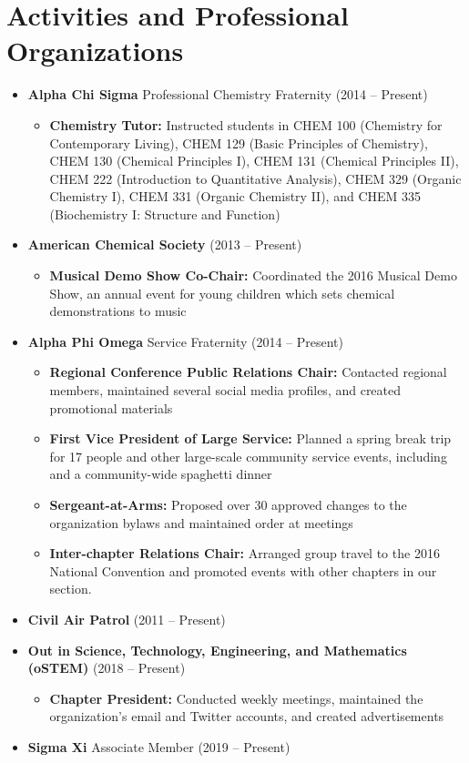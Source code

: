 \documentclass[letterpaper,11pt]{article}
\newcommand{\resumeItem}[2]{
  \item\small{
    \textbf{#1}{ #2 \vspace{-2pt}}
  }
}
\newcommand{\resumeSubItem}[2]{\resumeItem{#1}{#2}\vspace{-4pt}}
\newcommand{\resumeSubHeadingListStart}{\begin{itemize}[leftmargin=*]}
\newcommand{\resumeSubHeadingListEnd}{\end{itemize}}
\newcommand{\resumeItemListStart}{\begin{itemize}}
\newcommand{\resumeItemListEnd}{\end{itemize}\vspace{-5pt}}
\begin{document}
\section{Activities and Professional Organizations}
  \resumeSubHeadingListStart
    \resumeSubItem{Alpha Chi Sigma}
      {Professional Chemistry Fraternity (2014 -- Present)}
            \resumeItemListStart
        \resumeItem{Chemistry Tutor\textnormal{:}}
          {Instructed students in CHEM 100 (Chemistry for Contemporary Living), CHEM 129 (Basic Principles of Chemistry), CHEM 130 (Chemical Principles I), CHEM 131 (Chemical Principles II), CHEM 222 (Introduction to Quantitative Analysis), CHEM 329 (Organic Chemistry I), CHEM 331 (Organic Chemistry II), and CHEM 335 (Biochemistry I: Structure and Function)}
      \resumeItemListEnd
    \resumeSubItem{American Chemical Society}
      {(2013 -- Present)}
            \resumeItemListStart
        \resumeItem{Musical Demo Show Co-Chair\textnormal{:}}
          {Coordinated the 2016 Musical Demo Show, an annual event for young children which sets chemical demonstrations to music}
      \resumeItemListEnd
    \resumeSubItem{Alpha Phi Omega}
      {Service Fraternity (2014 -- Present)}
            \resumeItemListStart
        \resumeItem{Regional Conference Public Relations Chair\textnormal{:}}
          {Contacted regional members, maintained several social media profiles, and created promotional materials}
        \resumeItem{First Vice President of Large Service\textnormal{:}}
          {Planned a spring break trip for 17 people and other large-scale community service events, including and a community-wide spaghetti dinner}
        \resumeItem{Sergeant-at-Arms\textnormal{:}}
          {Proposed over 30 approved changes to the organization bylaws and maintained order at meetings}
        \resumeItem{Inter-chapter Relations Chair\textnormal{:}}
          {Arranged group travel to the 2016 National Convention and promoted events with other chapters in our section.}
      \resumeItemListEnd
    \resumeSubItem{Civil Air Patrol}
      {(2011 -- Present)}
   \resumeSubItem{Out in Science, Technology, Engineering, and Mathematics (oSTEM)}
      {(2018 -- Present)}
            \resumeItemListStart
        \resumeItem{Chapter President\textnormal{:}}
          {Conducted weekly meetings, maintained the organization's email and Twitter accounts, and created advertisements}
      \resumeItemListEnd
    \resumeSubItem{Sigma Xi}
      {Associate Member (2019 -- Present)}
  \resumeSubHeadingListEnd

\end{document}
